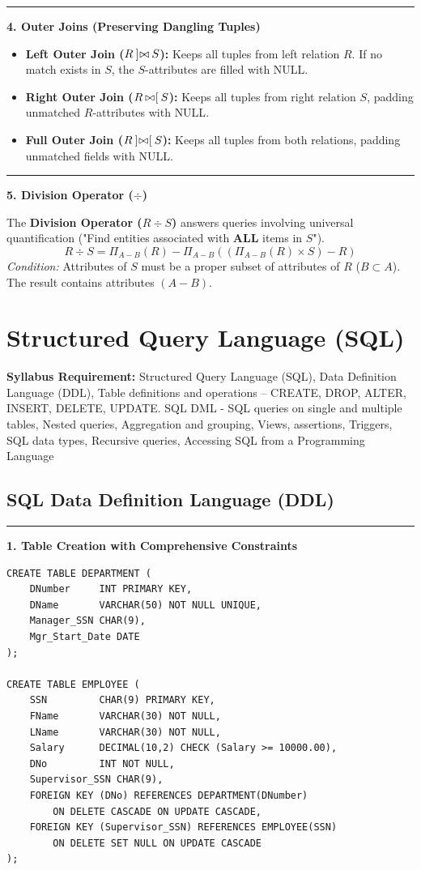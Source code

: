 \documentclass[11pt,a4paper]{article}
\newcommand{\ic}[1]{\mbox{\colorbox{AnthCodeBG}{\footnotesize\ttfamily\textcolor{AnthBlue}{#1}}}}
\newcommand{\concept}[1]{%
  \vspace{3pt}\noindent\textcolor{AnthGreen}{\rule{3.5pt}{10pt}}\enspace
  \textbf{\sffamily\color{AnthDark}#1}\par\vspace{2pt}%
}
\newcommand{\syllabusitem}[1]{%
  \begin{tcolorbox}[enhanced, colback=AnthOrange!8, colframe=AnthOrange, boxrule=0.4pt, arc=3pt, left=7pt, right=7pt, top=3pt, bottom=3pt]
    \small\sffamily\textbf{\color{AnthOrange}Syllabus Requirement:} #1
  \end{tcolorbox}
}
\newcommand{\LeftJoin}{\mathbin{]\mkern-4mu\bowtie}}
\newcommand{\RightJoin}{\mathbin{\bowtie\mkern-4mu[}}
\newcommand{\FullOuterJoin}{\mathbin{]\mkern-4mu\bowtie\mkern-4mu[}}
\begin{document}
\concept{4. Outer Joins (Preserving Dangling Tuples)}
\begin{itemize}
  \item \textbf{Left Outer Join ($R \LeftJoin S$):} Keeps all tuples from left relation $R$. If no match exists in $S$, the $S$-attributes are filled with \ic{NULL}.
  \item \textbf{Right Outer Join ($R \RightJoin S$):} Keeps all tuples from right relation $S$, padding unmatched $R$-attributes with \ic{NULL}.
  \item \textbf{Full Outer Join ($R \FullOuterJoin S$):} Keeps all tuples from both relations, padding unmatched fields with \ic{NULL}.
\end{itemize}

\concept{5. Division Operator ($\div$)}
The \textbf{Division Operator ($R \div S$)} answers queries involving universal quantification ("Find entities associated with \textbf{ALL} items in $S$").
\begin{equation}
  R \div S = \Pi_{A - B}(R) - \Pi_{A - B}\left( (\Pi_{A - B}(R) \times S) - R \right)
\end{equation}
\emph{Condition:} Attributes of $S$ must be a proper subset of attributes of $R$ ($B \subset A$). The result contains attributes $(A - B)$.

\clearpage
\section{Structured Query Language (SQL)}

\syllabusitem{Structured Query Language (SQL), Data Definition Language (DDL), Table definitions and operations – CREATE, DROP, ALTER, INSERT, DELETE, UPDATE. SQL DML - SQL queries on single and multiple tables, Nested queries, Aggregation and grouping, Views, assertions, Triggers, SQL data types, Recursive queries, Accessing SQL from a Programming Language}

\subsection{SQL Data Definition Language (DDL)}

\concept{1. Table Creation with Comprehensive Constraints}
\begin{lstlisting}
CREATE TABLE DEPARTMENT (
    DNumber     INT PRIMARY KEY,
    DName       VARCHAR(50) NOT NULL UNIQUE,
    Manager_SSN CHAR(9),
    Mgr_Start_Date DATE
);

CREATE TABLE EMPLOYEE (
    SSN         CHAR(9) PRIMARY KEY,
    FName       VARCHAR(30) NOT NULL,
    LName       VARCHAR(30) NOT NULL,
    Salary      DECIMAL(10,2) CHECK (Salary >= 10000.00),
    DNo         INT NOT NULL,
    Supervisor_SSN CHAR(9),
    FOREIGN KEY (DNo) REFERENCES DEPARTMENT(DNumber) 
        ON DELETE CASCADE ON UPDATE CASCADE,
    FOREIGN KEY (Supervisor_SSN) REFERENCES EMPLOYEE(SSN) 
        ON DELETE SET NULL ON UPDATE CASCADE
);
\end{lstlisting}
\end{document}
